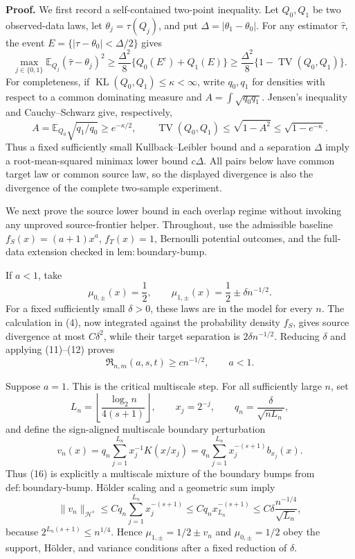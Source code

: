 \textbf{Proof.}
We first record a self-contained two-point inequality.  Let \(Q_0,Q_1\) be two observed-data laws, let \(\theta_j=\tau(Q_j)\), and put \(\Delta=|\theta_1-\theta_0|\).  For any estimator \(\widehat\tau\), the event \(E=\{|\widehat\tau-\theta_0|<\Delta/2\}\) gives
\[
\max_{j\in\{0,1\}}\mathbb E_{Q_j}(\widehat\tau-\theta_j)^2
\ge \frac{\Delta^2}{8}
 \{Q_0(E^c)+Q_1(E)\}
\ge \frac{\Delta^2}{8}\{1-\operatorname{TV}(Q_0,Q_1)\}.
\tag{11}
\]
For completeness, if \(\operatorname{KL}(Q_0,Q_1)\le\kappa<\infty\), write \(q_0,q_1\) for densities with respect to a common dominating measure and \(A=\int\sqrt{q_0q_1}\).  Jensen's inequality and Cauchy--Schwarz give, respectively,
\[
A=\mathbb E_{Q_0}\sqrt{q_1/q_0}\ge e^{-\kappa/2},
\qquad
\operatorname{TV}(Q_0,Q_1)
\le\sqrt{1-A^2}
\le\sqrt{1-e^{-\kappa}}.
\tag{12}
\]
Thus a fixed sufficiently small Kullback--Leibler bound and a separation \(\Delta\) imply a root-mean-squared minimax lower bound \(c\Delta\).  All pairs below have common target law or common source law, so the displayed divergence is also the divergence of the complete two-sample experiment.

We next prove the source lower bound in each overlap regime without invoking any unproved source-frontier helper.  Throughout, use the admissible baseline \(f_S(x)=(a+1)x^a\), \(f_T(x)=1\), Bernoulli potential outcomes, and the full-data extension checked in \(\mathrm{lem:boundary\text{-}bump}\).

If \(a<1\), take
\[
\mu_{0,\pm}(x)=\frac12,
\qquad
\mu_{1,\pm}(x)=\frac12\pm\delta n^{-1/2}.
\tag{13}
\]
For a fixed sufficiently small \(\delta>0\), these laws are in the model for every \(n\).  The calculation in (4), now integrated against the probability density \(f_S\), gives source divergence at most \(C\delta^2\), while their target separation is \(2\delta n^{-1/2}\).  Reducing \(\delta\) and applying (11)--(12) proves
\[
\mathfrak R_{n,m}(a,s,t)\ge c n^{-1/2},
\qquad a<1.
\tag{14}
\]

Suppose \(a=1\).  This is the critical multiscale step.  For all sufficiently large \(n\), set
\[
L_n=\left\lfloor\frac{\log_2 n}{4(s+1)}\right\rfloor,
\qquad x_j=2^{-j},
\qquad q_n=\frac{\delta}{\sqrt{nL_n}},
\tag{15}
\]
and define the sign-aligned multiscale boundary perturbation
\[
v_n(x)=q_n\sum_{j=1}^{L_n}x_j^{-1}K(x/x_j)
=q_n\sum_{j=1}^{L_n}x_j^{-(s+1)}b_{x_j}(x).
\tag{16}
\]
Thus (16) is explicitly a multiscale mixture of the boundary bumps from \(\mathrm{def:boundary\text{-}bump}\).  Hölder scaling and a geometric sum imply
\[
\|v_n\|_{\mathcal H^s}
\le Cq_n\sum_{j=1}^{L_n}x_j^{-(s+1)}
\le Cq_nx_{L_n}^{-(s+1)}
\le C\delta\frac{n^{-1/4}}{\sqrt{L_n}},
\tag{17}
\]
because \(2^{L_n(s+1)}\le n^{1/4}\).  Hence \(\mu_{1,\pm}=1/2\pm v_n\) and \(\mu_{0,\pm}=1/2\) obey the support, Hölder, and variance conditions after a fixed reduction of \(\delta\).

